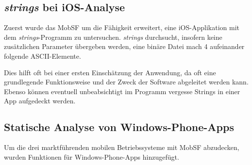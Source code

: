 \subsection{\textit{strings} bei iOS-Analyse}
Zuerst wurde das MobSF um die Fähigkeit erweitert, eine iOS-Applikation mit dem \textit{strings}-Programm zu untersuchen. \textit{strings} durchsucht, insofern keine zusätzlichen Parameter übergeben werden, eine binäre Datei mach 4 aufeinander folgende ASCII-Elemente.

Dies hilft oft bei einer ersten Einschätzung der Anwendung, da oft eine grundlegende Funktionsweise und der Zweck der Software abgeleitet werden kann. Ebenso können eventuell unbeabsichtigt im Programm vergesse Strings in einer App aufgedeckt werden.

\subsection{Statische Analyse von Windows-Phone-Apps}
Um die drei marktführenden mobilen Betriebssysteme mit MobSF abzudecken, wurden Funktionen für Windows-Phone-Apps hinzugefügt.